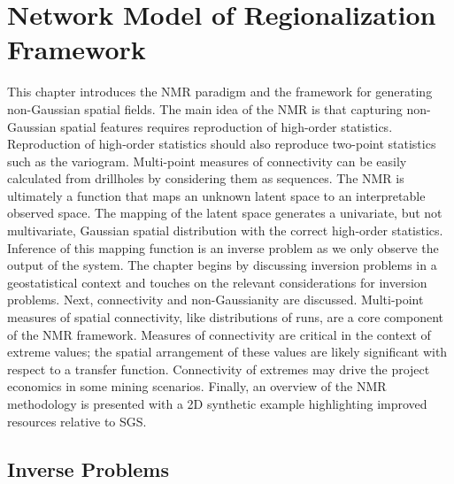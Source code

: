 
\chapter{Network Model of Regionalization Framework}
\label{ch:03framework}

This chapter introduces the \gls{NMR} paradigm and the framework for generating non-Gaussian spatial fields. The main idea of the \gls{NMR} is that capturing non-Gaussian spatial features requires reproduction of high-order statistics. Reproduction of high-order statistics should also reproduce two-point statistics such as the variogram. Multi-point measures of connectivity can be easily calculated from drillholes by considering them as sequences. The \gls{NMR} is ultimately a function that maps an unknown latent space to an interpretable observed space. The mapping of the latent space generates a univariate, but not multivariate, Gaussian spatial distribution with the correct high-order statistics. Inference of this mapping function is an inverse problem as we only observe the output of the system. The chapter begins by discussing inversion problems in a geostatistical context and touches on the relevant considerations for inversion problems. Next, connectivity and non-Gaussianity are discussed. Multi-point measures of spatial connectivity, like distributions of runs, are a core component of the \gls{NMR} framework. Measures of connectivity are critical in the context of extreme values; the spatial arrangement of these values are likely significant with respect to a transfer function. Connectivity of extremes may drive the project economics in some mining scenarios. Finally, an overview of the \gls{NMR} methodology is presented with a \gls{2D} synthetic example highlighting improved resources relative to \gls{SGS}.


\FloatBarrier
\section{Inverse Problems}
\label{sec:03inverse}

